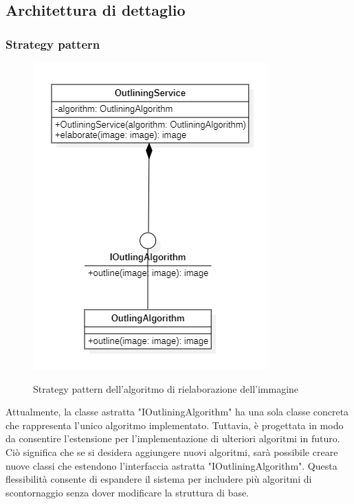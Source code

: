 \subsection{Architettura di dettaglio}

\subsubsection{Strategy pattern}

\begin{figure}[H]
    \centering
    \includegraphics[scale = 1.0]{img/outlineStrategy.png}\\
    \caption{Strategy pattern dell'algoritmo di rielaborazione dell'immagine}
\end{figure}

Attualmente, la classe astratta "IOutliningAlgorithm" ha una sola classe concreta che rappresenta l'unico algoritmo implementato. Tuttavia, è progettata in modo da consentire l'estensione per l'implementazione di ulteriori 
algoritmi in futuro. Ciò significa che se si desidera aggiungere nuovi algoritmi, 
sarà possibile creare nuove classi che estendono l'interfaccia astratta "IOutliningAlgorithm". 
Questa flessibilità consente di espandere il sistema per includere più algoritmi di scontornaggio senza dover 
modificare la struttura di base.

